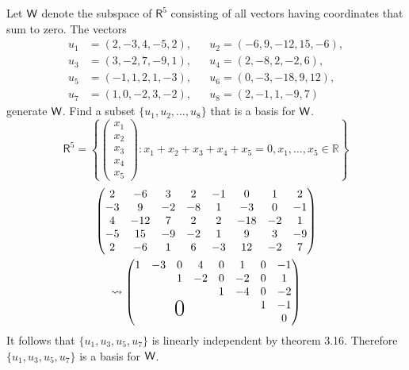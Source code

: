 Let $\mathsf{W}$ denote the subspace of $\mathsf{R}^5$ consisting of all
vectors having coordinates that sum to zero. The vectors
\begin{align*}
u_1 &= (2,-3,4,-5,2), && u_2 = (-6,9,-12,15,-6),\\
u_3 &= (3,-2,7,-9,1), && u_4 = (2,-8,2,-2,6),\\
u_5 &= (-1,1,2,1,-3), && u_6 = (0,-3,-18,9,12),\\
u_7 &= (1,0,-2,3,-2), && u_8 = (2,-1,1,-9,7)
\end{align*}
generate $\mathsf{W}$. Find a subset $\{u_1,u_2,\dotsc,u_8\}$ that is a basis
for $\mathsf{W}$.
\begin{equation}
\mathsf{R}^5 =
\left\{ \begin{pmatrix}x_1\\x_2\\x_3\\x_4\\x_5\end{pmatrix} \colon x_1
  +x_2 +x_3 + x_4 +x_5 =0, x_1,\dotsc,x_5 \in \mathbb{R}\right\}
\end{equation}
\begin{gather}
\begin{pmatrix}
2 & -6 & 3 & 2 & -1 & 0 & 1 & 2\\
-3 & 9 & -2 & -8 & 1 & -3 & 0 &-1\\
4& -12 & 7 &2 &2 & -18 & -2 & 1\\
-5 & 15 & -9 & -2 & 1 & 9 & 3 & -9\\
2 & -6 & 1 & 6 &-3 & 12 & -2 & 7
\end{pmatrix}\\
\leadsto
\begin{pmatrix}
1 & -3 & 0 & 4 & 0 & 1 & 0 & -1\\
  &    & 1 & -2 & 0 & -2 & 0 &1\\
  &    &   &    & 1 & -4 & 0 & -2\\
  &    & \bigzero  &    &   &    & 1 & -1 \\
  &    &   &    &   &    &   & 0\\
\end{pmatrix}
\end{gather}
It follows that $\{u_1,u_3,u_5,u_7\}$ is linearly independent by
theorem 3.16. Therefore $\{u_1,u_3,u_5,u_7\}$ is a basis for $\mathsf{W}$.

